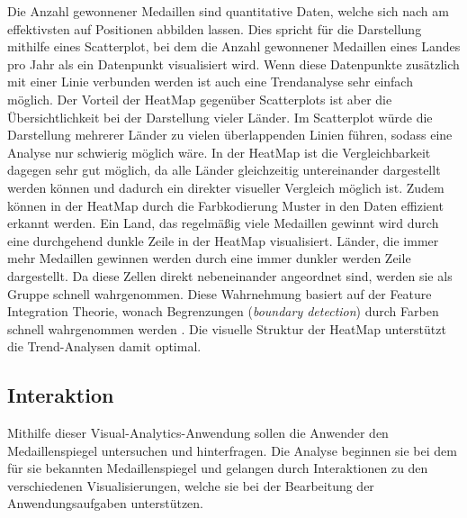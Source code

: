 Die Anzahl gewonnener Medaillen sind quantitative Daten, welche sich nach \cite{bertin} am effektivsten auf Positionen abbilden lassen. Dies spricht für die Darstellung mithilfe eines Scatterplot, bei dem die Anzahl gewonnener Medaillen eines Landes pro Jahr als ein Datenpunkt visualisiert wird. Wenn diese Datenpunkte zusätzlich mit einer Linie verbunden werden ist auch eine Trendanalyse sehr einfach möglich. Der Vorteil der HeatMap gegenüber Scatterplots ist aber die Übersichtlichkeit bei der Darstellung vieler Länder. Im Scatterplot würde die Darstellung mehrerer Länder zu vielen überlappenden Linien führen, sodass eine Analyse nur schwierig möglich wäre. In der HeatMap ist die Vergleichbarkeit dagegen sehr gut möglich, da alle Länder gleichzeitig untereinander dargestellt werden können und dadurch ein direkter visueller Vergleich möglich ist. Zudem können in der HeatMap durch die Farbkodierung Muster in den Daten effizient erkannt werden. Ein Land, das regelmäßig viele Medaillen gewinnt wird durch eine durchgehend dunkle Zeile in der HeatMap visualisiert. Länder, die immer mehr Medaillen gewinnen werden durch eine immer dunkler werden Zeile dargestellt. Da diese Zellen direkt nebeneinander angeordnet sind, werden sie als Gruppe schnell wahrgenommen. Diese Wahrnehmung basiert auf der Feature Integration Theorie, wonach Begrenzungen (\textit{boundary detection}) durch Farben schnell wahrgenommen werden \cite{preAttent}. Die visuelle Struktur der HeatMap unterstützt die Trend-Analysen damit optimal.

\subsection{Interaktion}
Mithilfe dieser Visual-Analytics-Anwendung sollen die Anwender den Medaillenspiegel untersuchen und hinterfragen. Die Analyse beginnen sie bei dem für sie bekannten Medaillenspiegel und gelangen durch Interaktionen zu den verschiedenen Visualisierungen, welche sie bei der Bearbeitung der Anwendungsaufgaben unterstützen.

